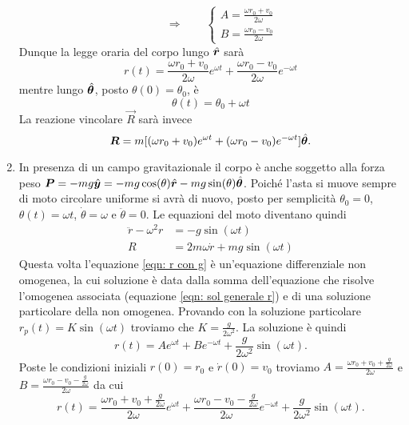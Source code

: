 \begin{sol}
\begin{enumerate}
\[		\qquad \Rightarrow \qquad 
		\begin{cases*}
		A = \frac{\omega r_0 + v_0}{2 \omega} \\
		B = \frac{\omega r_0 - v_0}{2 \omega}
		\end{cases*}\]
		Dunque la legge oraria del corpo lungo $ \hat{\boldsymbol{r}} $ sarà 
		\begin{equation} \label{eqn: sol particolare r}
		r(t) = \frac{\omega r_0 + v_0}{2 \omega} e^{\omega t} + \frac{\omega r_0 - v_0}{2 \omega} e^{- \omega t}
		\end{equation}
		mentre lungo $ \hat{\boldsymbol{\theta}} $, posto $ \theta(0) = \theta_0 $, è 
		\begin{equation} \label{eqn: sol particolare theta}
		\theta (t) = \theta_0 + \omega t
		\end{equation}
		La reazione vincolare $ \vec R $ sarà invece 
		\begin{equation} \label{eqn: reazione}
		\boldsymbol{R} = m [(\omega r_0 + v_0) e^{\omega t} + (\omega r_0 - v_0) e^{- \omega t}] \hat{\boldsymbol{\theta}}.
		\end{equation}
		\item In presenza di un campo gravitazionale il corpo è anche soggetto alla forza peso $ \boldsymbol{P} = - m g \hat{\boldsymbol{y}} = - m g \cos(\theta) \hat{\boldsymbol{r}} - m g \sin(\theta) \hat{\boldsymbol{\theta}} $. Poiché l'asta si muove sempre di moto circolare uniforme si avrà di nuovo, posto per semplicità $ \theta_0 = 0 $, $ \theta(t) = \omega t $, $ \dot{\theta} = \omega $ e $ \ddot{\theta} = 0 $. Le equazioni del moto diventano quindi
		\begin{align}
		\ddot{r} - \omega^2 r & = - g \sin (\omega t) \label{eqn: r con g} \\
		R & = 2 m \omega \dot{r} + m g \sin(\omega t) \label{eqn: theta con g} 
		\end{align}
		Questa volta l'equazione \eqref{eqn: r con g} è un'equazione differenziale non omogenea, la cui soluzione è data dalla somma dell'equazione che risolve l'omogenea associata (equazione \eqref{eqn: sol generale r}) e di una soluzione particolare della non omogenea. Provando con la soluzione particolare $ r_p(t) = K \sin(\omega t) $ troviamo che $ K = \frac{g}{2 \omega^2} $. La soluzione è quindi
		\begin{equation}
		r(t) = A e^{\omega t} + B e^{- \omega t} + \frac{g}{2 \omega^2} \sin(\omega t). 
		\end{equation}
		Poste le condizioni iniziali $ r(0) = r_0 $ e $ \dot{r}(0) = v_0 $ troviamo $ A = \frac{\omega r_0 + v_0 + \frac{g}{2\omega}}{2 \omega} $ e $ B = \frac{\omega r_0 - v_0 - \frac{g}{2\omega}}{2 \omega} $ da cui 
		\begin{equation}
		r(t) = \frac{\omega r_0 + v_0 + \frac{g}{2\omega}}{2 \omega} e^{\omega t} + \frac{\omega r_0 - v_0 - \frac{g}{2\omega}}{2 \omega} e^{- \omega t} + \frac{g}{2 \omega^2} \sin(\omega t).
		\end{equation}
	 	\end{enumerate}
\end{sol}

